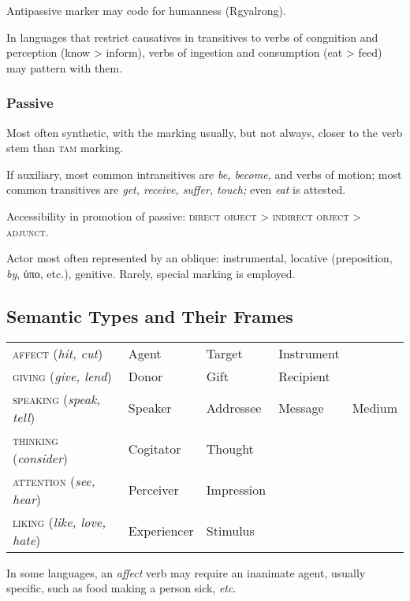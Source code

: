 \documentclass[11pt]{article}
\newcommand{\E}[1]{\textit{#1}}   %
\newcommand{\I}[1]{\textsc{#1}}   %
\begin{document}
Antipassive marker may code for humanness (Rgyalrong).

In languages that restrict causatives in transitives to verbs of
congnition and perception (know > inform), verbs of ingestion and
consumption (eat > feed) may pattern with them.

\subsubsection{Passive} Most often synthetic, with the marking usually,
but not always, closer to the verb stem than \I{tam} marking.

If auxiliary, most common intransitives are \textit{be, become,} and
verbs of motion; most common transitives are \textit{get, receive,
suffer, touch;} even \textit{eat} is attested.

Accessibility in promotion of passive: \I{direct object > indirect
object > adjunct}.

Actor most often represented by an oblique: instrumental, locative
(preposition, \textit{by}, ὑπο, etc.), genitive.  Rarely, special
marking is employed.


\subsection{Semantic Types and Their Frames}

\begin{center}
\begin{tabular}{lllll}
\I{affect} (\E{hit, cut}) & Agent & Target & Instrument \\
\I{giving} (\E{give, lend}) & Donor & Gift & Recipient \\
\I{speaking} (\E{speak, tell}) & Speaker & Addressee & Message & Medium \\
\I{thinking} (\E{consider}) & Cogitator & Thought \\
\I{attention} (\E{see, hear}) & Perceiver & Impression \\
\I{liking} (\E{like, love, hate}) & Experiencer & Stimulus
\end{tabular}
\end{center}

In some languages, an \E{affect} verb may require an inanimate agent,
usually specific, such as food making a person sick, \textit{etc}.
\end{document}
